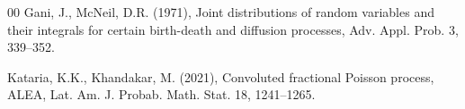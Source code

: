 \documentclass[12pt, twoside, english, headsepline]{article}
\theoremstyle{definition} %
\numberwithin{equation}{section} %
\begin{document}
{\begin{thebibliography}{00}
Gani, J., McNeil, D.R. (1971), Joint distributions of random variables and their integrals for certain birth-death and diffusion processes, Adv. Appl. Prob. 3, 339--352.
%
%
%
%
%
%

%
%
%
Kataria, K.K., Khandakar, M. (2021), Convoluted fractional Poisson process, ALEA, Lat. Am. J. Probab. Math. Stat. 18, 1241--1265.


\end{thebibliography}}
\end{document}
